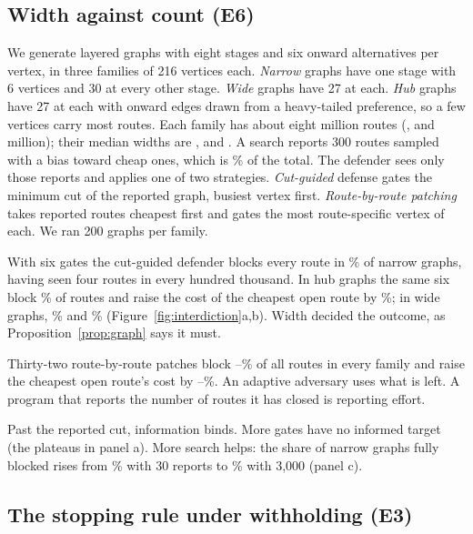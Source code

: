 \documentclass[10pt,twocolumn]{article}
\theoremstyle{plain}
\theoremstyle{definition}
\begin{document}
\subsection{Width against count (E6)}

We generate layered graphs with eight stages and six onward alternatives per vertex, in three
families of 216 vertices each. \emph{Narrow} graphs have one stage with 6 vertices and 30 at
every other stage. \emph{Wide} graphs have 27 at each. \emph{Hub} graphs have 27 at each
with onward edges drawn from a heavy-tailed preference, so a few vertices carry most routes.
Each family has about eight million routes (\CountChoke, \CountHub{} and \CountWide{}
million); their median widths are \WidthChoke, \WidthHub{} and \WidthWide. A search reports
300 routes sampled with a bias toward cheap ones, which is \SeenShareChoke\% of the total.
The defender sees only those reports and applies one of two strategies. \emph{Cut-guided}
defense gates the minimum cut of the reported graph, busiest vertex first.
\emph{Route-by-route patching} takes reported routes cheapest first and gates the most
route-specific vertex of each. We ran 200 graphs per family.

With six gates the cut-guided defender blocks every route in \CutSeveredChokeSix\% of narrow
graphs, having seen four routes in every hundred thousand. In hub graphs the same six block
\CutBlockedHubSix\% of routes and raise the cost of the cheapest open route by
\CutGainHubSix\%; in wide graphs, \CutBlockedWideSix\% and \CutGainWideSix\%
(Figure~\ref{fig:interdiction}a,b). Width decided the outcome, as
Proposition~\ref{prop:graph} says it must.

Thirty-two route-by-route patches block
\PatchBlockedChokeThirtyTwo--\PatchBlockedHubThirtyTwo\% of all routes in every family and
raise the cheapest open route's cost by
\PatchGainWideThirtyTwo--\PatchGainHubThirtyTwo\%. An adaptive adversary uses what is left. A
program that reports the number of routes it has closed is reporting effort.

Past the reported cut, information binds. More gates have no informed target (the plateaus
in panel a). More search helps: the share of narrow graphs fully blocked rises from
\SeveredNChokeThirty\% with 30 reports to \SeveredNChokeThreeThousand\% with 3,000 (panel c).

\subsection{The stopping rule under withholding (E3)}
\end{document}
